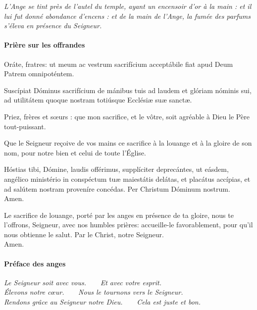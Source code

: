 \documentclass[twoside]{article}
\begin{document}


\emph{L’Ange se tint près de l’autel du temple,
ayant un encensoir d’or à la main :
et il lui fut donné abondance d’encens :
et de la main de l’Ange, la fumée des parfums
s’éleva en présence du Seigneur.}

\paragraph{Prière sur les offrandes}
\begin{paracol}{2}

\vv Oráte, fratres:
ut meum ac vestrum sacrifícium
acceptábile fiat apud Deum Patrem omnipoténtem.

\rr Suscípiat Dóminus sacrifícium de mánibus tuis
ad laudem et glóriam nóminis sui,
ad utilitátem quoque nostram
totiúsque Ecclésiæ suæ sanctæ.

\switchcolumn

\vv Priez, frères et sœurs : que mon sacrifice, et le vôtre, soit agréable à Dieu le Père tout-puissant.

\rr Que le Seigneur reçoive de vos mains ce sacrifice à la louange et à la gloire de son nom, pour notre bien et celui de toute l’Église.

\switchcolumn*

Hóstias tibi, Dómine, laudis offérimus,
supplíciter deprecántes, ut eásdem,
angélico ministério in conspéctum tuæ maiestátis delátas,
et placátus accípias,
et ad salútem nostram proveníre concédas.
Per Christum Dóminum nostrum.\\
\rr Amen.

\switchcolumn
Le sacrifice de louange,
porté par les anges en présence de ta gloire,
nous te l'offrons, Seigneur,
avec nos humbles prières:
accueille-le favorablement,
pour qu'il nous obtienne le salut.
Par le Christ, notre Seigneur.\\
\rr Amen.

\end{paracol}

\paragraph{Préface des anges}


\emph{\vv Le Seigneur soit avec vous.~~~~\rr Et avec votre esprit.\\
\vv Élevons notre cœur.~~~~\rr Nous le tournons vers le Seigneur.\\
\vv Rendons grâce au Seigneur notre Dieu.~~~~\rr Cela est juste et bon.}
\end{document}
